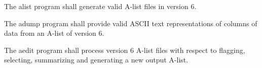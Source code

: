 \begin{description}

 The \acs{alist} program shall generate valid \acs{A-list} files in 
version 6.



 The \acs{adump} program shall provide valid ASCII text representations 
of columns of data from an \acs{A-list} of version 6.

 The \acs{aedit} program shall process version 6 \acs{A-list} 
files with respect to flagging, selecting, summarizing and generating a new 
output \acs{A-list}.






%
%
%
%



%

\end{description}


